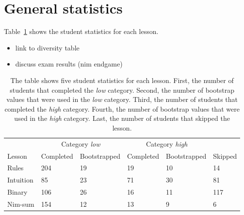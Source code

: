 \section{General statistics}
\label{sec:results_general}
Table~\ref{tab:exp_stats_students} shows the student statistics for each
lesson.
\begin{itemize}
	\item link to diversity table
	\item discuss exam results (nim endgame)
\end{itemize}
\begin{table}
	\centering
	\begin{tabular}{l|lllll}\hline
		\multicolumn{1}{l}{}& \multicolumn{2}{c}{Category \emph{low}} & \multicolumn{2}{c}{Category
			\emph{high}} & \\
		\multicolumn{1}{l}{Lesson} & Completed & Bootstrapped & Completed & Bootstrapped & Skipped\\
		\hline
		Rules & 204 & 19 & 19 & 10 & 14 \\
		Intuition & 85 &  23 & 71 & 30 & 81 \\
		Binary & 106 & 26 & 16 & 11 & 117 \\
		Nim-sum & 154 & 12 & 13 & 9 & 6 \\
	\end{tabular}
	\caption[Student statistics of each lesson]{The table shows five student statistics for each lesson.
	First, the number of students that completed the \emph{low} category.
	Second, the number of bootstrap values that were used in the
	\emph{low} category. Third, the number of students that completed the
	\emph{high} category. Fourth, the number of bootstrap values that were used in
	the \emph{high} category. Last, the number of students that skipped the
	lesson.}
	\label{tab:exp_stats_students}
\end{table}

